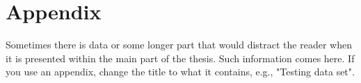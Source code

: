 \chapter{Appendix}
\label{ch:appendix}

Sometimes there is data or some longer part that would distract the reader when
it is presented within the main part of the thesis. Such information comes here.
If you use an appendix, change the title to what it contains, e.g., "Testing
data set".